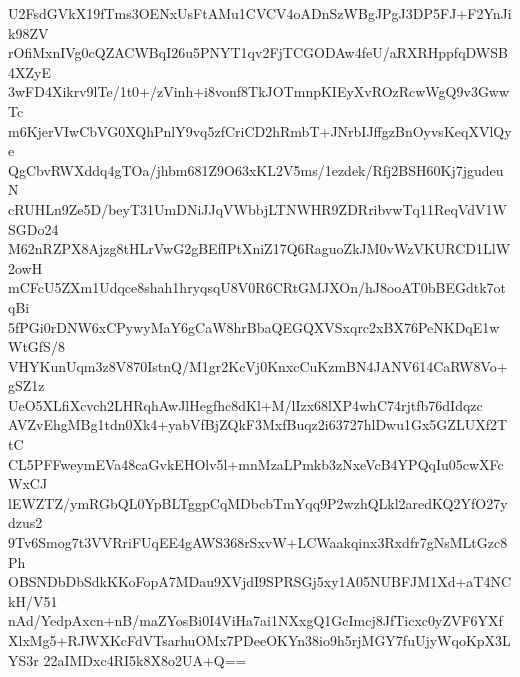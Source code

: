 U2FsdGVkX19fTms3OENxUsFtAMu1CVCV4oADnSzWBgJPgJ3DP5FJ+F2YnJik98ZV
rOfiMxnIVg0cQZACWBqI26u5PNYT1qv2FjTCGODAw4feU/aRXRHppfqDWSB4XZyE
3wFD4Xikrv9lTe/1t0+/zVinh+i8vonf8TkJOTmnpKIEyXvROzRcwWgQ9v3GwwTc
m6KjerVIwCbVG0XQhPnlY9vq5zfCriCD2hRmbT+JNrbIJffgzBnOyvsKeqXVlQye
QgCbvRWXddq4gTOa/jhbm681Z9O63xKL2V5ms/1ezdek/Rfj2BSH60Kj7jgudeuN
cRUHLn9Ze5D/beyT31UmDNiJJqVWbbjLTNWHR9ZDRribvwTq11ReqVdV1WSGDo24
M62nRZPX8Ajzg8tHLrVwG2gBEfIPtXniZ17Q6RaguoZkJM0vWzVKURCD1LlW2owH
mCFcU5ZXm1Udqce8shah1hryqsqU8V0R6CRtGMJXOn/hJ8ooAT0bBEGdtk7otqBi
5fPGi0rDNW6xCPywyMaY6gCaW8hrBbaQEGQXVSxqrc2xBX76PeNKDqE1wWtGfS/8
VHYKunUqm3z8V870IstnQ/M1gr2KcVj0KnxcCuKzmBN4JANV614CaRW8Vo+gSZ1z
UeO5XLfiXcvch2LHRqhAwJlHegfhc8dKl+M/lIzx68lXP4whC74rjtfb76dIdqzc
AVZvEhgMBg1tdn0Xk4+yabVfBjZQkF3MxfBuqz2i63727hlDwu1Gx5GZLUXf2TtC
CL5PFFweymEVa48caGvkEHOlv5l+mnMzaLPmkb3zNxeVcB4YPQqIu05cwXFcWxCJ
lEWZTZ/ymRGbQL0YpBLTggpCqMDbcbTmYqq9P2wzhQLkl2aredKQ2YfO27ydzus2
9Tv6Smog7t3VVRriFUqEE4gAWS368rSxvW+LCWaakqinx3Rxdfr7gNsMLtGzc8Ph
OBSNDbDbSdkKKoFopA7MDau9XVjdI9SPRSGj5xy1A05NUBFJM1Xd+aT4NCkH/V51
nAd/YedpAxcn+nB/maZYosBi0I4ViHa7ai1NXxgQ1GcImcj8JfTicxc0yZVF6YXf
XlxMg5+RJWXKcFdVTsarhuOMx7PDeeOKYn38io9h5rjMGY7fuUjyWqoKpX3LYS3r
22aIMDxc4RI5k8X8o2UA+Q==
